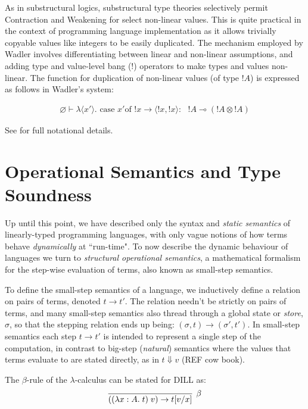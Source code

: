 \documentclass[]{unswthesis}
\newcommand{\case}{\text{ case }}
\newcommand{\of}{\text{of }}
\newcommand{\yields}{\multimap}
\let\i\textit
\begin{document}
As in substructural logics, substructural type theories selectively permit Contraction and Weakening for select non-linear values. This is quite practical in the context of programming language implementation as it allows trivially copyable values like integers to be easily duplicated. The mechanism employed by Wadler \cite{wadler93} involves differentiating between linear and non-linear assumptions, and adding type and value-level bang (!) operators to make types and values non-linear. The function for duplication of non-linear values (of type $!A$) is expressed as follows in Wadler's system:

\begin{eqnarray*}
\varnothing \vdash \lambda \langle x' \rangle . \case x' \of !x \rightarrow \langle !x, !x\rangle :\text{ } !A \yields (!A \otimes !A)
\end{eqnarray*}

See \cite{wadler93} for full notational details.

\section{Operational Semantics and Type Soundness}

Up until this point, we have described only the syntax and \i{static semantics} of linearly-typed programming languages, with only vague notions of how terms behave \i{dynamically} at ``run-time". To now describe the dynamic behaviour of languages we turn to \i{structural operational semantics}, a mathematical formalism for the step-wise evaluation of terms, also known as small-step semantics.

To define the small-step semantics of a language, we inductively define a relation on pairs of terms, denoted $t \to t'$. The relation needn't be strictly on pairs of terms, and many small-step semantics also thread through a global state or \i{store}, $\sigma$, so that the stepping relation ends up being: $(\sigma, t) \to (\sigma', t')$. In small-step semantics each step $t \to t'$ is intended to represent a single step of the computation, in contrast to big-step (\i{natural}) semantics where the values that terms evaluate to are stated directly, as in $t \Downarrow v$ (REF cow book).

The $\beta$-rule of the $\lambda$-calculus can be stated for DILL as:
\begin{eqnarray*}
\infer[\beta]{((\lambda x : A. \; t) \; v) \to t[v/x]}{}
\end{eqnarray*}
\end{document}
